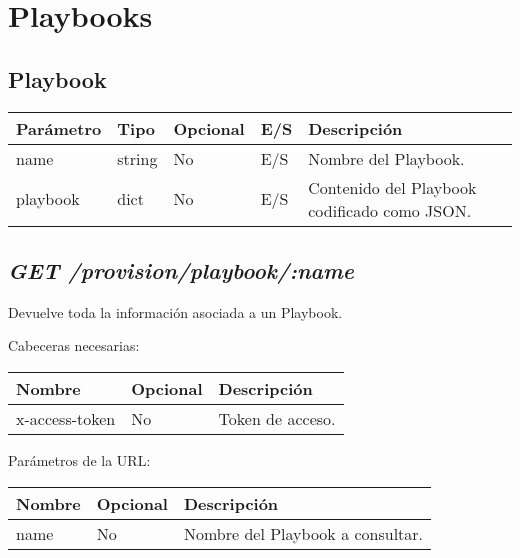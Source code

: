 \section{Playbooks}

	\subsection{Playbook}
		\begin{table}[!h]
			\centering
	\begin{adjustbox}{max width=\textwidth}
			\begin{tabular}{|l|l|l|l|l|}
				\hline
				Parámetro & Tipo & Opcional & E/S & Descripción \\ \hline
				name & string & No & E/S & Nombre del Playbook. \\ \hline
				playbook & dict & No & E/S & Contenido del Playbook codificado como JSON. \\ \hline
			\end{tabular}
\end{adjustbox}
		\end{table}
	
	\subsection{\textit{GET /provision/playbook/:name}}
		Devuelve toda la información asociada a un Playbook.
		
		Cabeceras necesarias:
		\begin{table}[h!]
			\centering
	\begin{adjustbox}{max width=\textwidth}
			\begin{tabular}{|l|l|l|}
				\hline
				Nombre & Opcional & Descripción \\ \hline
				x-access-token & No & Token de acceso. \\ \hline
			\end{tabular}
\end{adjustbox}
		\end{table}
		
		Parámetros de la URL:
		\begin{table}[h!]
			\centering
	\begin{adjustbox}{max width=\textwidth}
			\begin{tabular}{|l|l|l|}
				\hline
				Nombre & Opcional & Descripción \\ \hline
				name & No & Nombre del Playbook a consultar. \\ \hline
			\end{tabular}
\end{adjustbox}
		\end{table}
		
